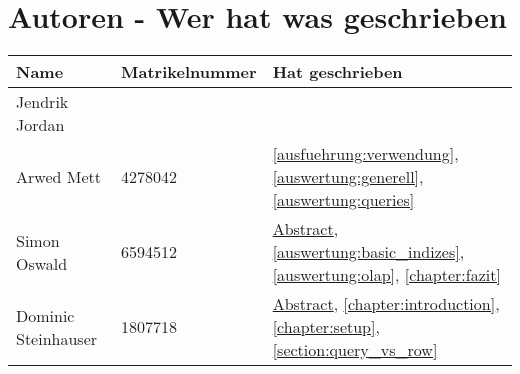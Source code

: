 \chapter{Autoren - Wer hat was geschrieben}
\begin{table}[H]
	\centering
	\begin{tabularx}{\textwidth}{llX}
		\toprule
		Name                &	Matrikelnummer  & Hat geschrieben \\
		\toprule
		Jendrik Jordan      &                   & \\
		Arwed Mett          &   4278042         & \autoref{ausfuehrung:verwendung}, \autoref{auswertung:generell}, \autoref{auswertung:queries} \\
		Simon Oswald        &   6594512         & \hyperref[abstract]{Abstract}, \autoref{auswertung:basic_indizes}, \autoref{auswertung:olap}, \autoref{chapter:fazit} \\
		Dominic Steinhauser &   1807718         & \hyperref[abstract]{Abstract}, \autoref{chapter:introduction}, \autoref{chapter:setup}, \autoref{section:query_vs_row} \\
		\bottomrule
	\end{tabularx}
	\label{tab:autoren}
\end{table}

